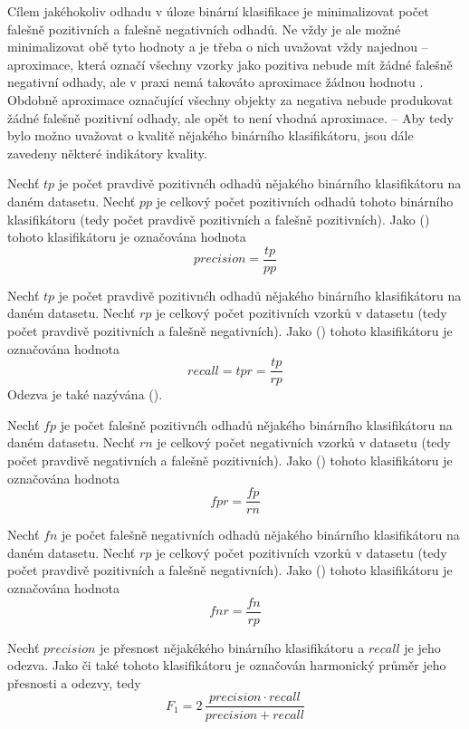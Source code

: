 Cílem jakéhokoliv odhadu v úloze binární klasifikace je minimalizovat počet falešně pozitivních a falešně negativních odhadů. Ne vždy je ale možné minimalizovat obě tyto hodnoty a je třeba o nich uvažovat vždy najednou -- aproximace, která označí všechny vzorky jako pozitiva nebude mít žádné falešně negativní odhady, ale v praxi nemá takováto aproximace žádnou hodnotu . Obdobně aproximace označující všechny objekty za negativa nebude produkovat žádné falešně pozitivní odhady, ale opět to není vhodná aproximace. -- Aby tedy bylo možno uvažovat o kvalitě nějakého binárního klasifikátoru, jsou dále zavedeny některé indikátory kvality.

\begin{define}
	Nechť \( tp \) je počet pravdivě pozitivnćh odhadů nějakého binárního klasifikátoru na daném datasetu. Nechť \( pp \) je celkový počet pozitivních odhadů tohoto binárního klasifikátoru (tedy počet pravdivě pozitivních a falešně pozitivních). Jako  () tohoto klasifikátoru je označována hodnota
	\[ precision = \frac{tp}{pp} \]
\end{define}

\begin{define}
	Nechť \( tp \) je počet pravdivě pozitivnćh odhadů nějakého binárního klasifikátoru na daném datasetu. Nechť \( rp \) je celkový počet pozitivních vzorků v datasetu (tedy počet pravdivě pozitivních a falešně negativních). Jako  () tohoto klasifikátoru je označována hodnota
	\[ recall = tpr = \frac{tp}{rp} \]
	Odezva je také nazývána  ().
\end{define}

\begin{define}
	Nechť \( fp \) je počet falešně pozitivnćh odhadů nějakého binárního klasifikátoru na daném datasetu. Nechť \( rn \) je celkový počet negativních vzorků v datasetu (tedy počet pravdivě negativních a falešně pozitivních). Jako  () tohoto klasifikátoru je označována hodnota
	\[ fpr = \frac{fp}{rn} \]
\end{define}

\begin{define}
	Nechť \( fn \) je počet falešně negativních odhadů nějakého binárního klasifikátoru na daném datasetu. Nechť \( rp \) je celkový počet pozitivních vzorků v datasetu (tedy počet pravdivě pozitivních a falešně negativních). Jako  () tohoto klasifikátoru je označována hodnota
	\[ fnr = \frac{fn}{rp} \]
\end{define}

\begin{define}
	Nechť \( precision \) je přesnost nějakékého binárního klasifikátoru a \( recall \) je jeho odezva. Jako  či také  tohoto klasifikátoru je označován harmonický průměr jeho přesnosti a odezvy, tedy
	\[ F_1 = 2 \, \frac{precision \cdot recall}{precision + recall} \]
\end{define}

